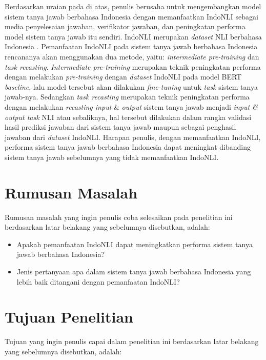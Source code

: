 Berdasarkan uraian pada di atas, penulis berusaha untuk mengembangkan model sistem tanya jawab berbahasa Indonesia dengan memanfaatkan IndoNLI sebagai media penyelesaian jawaban, verifikator jawaban, dan peningkatan performa model sistem tanya jawab itu sendiri. IndoNLI merupakan \emph{dataset} NLI berbahasa Indonesia \citep{mahendra-etal-2021-indonli}. Pemanfaatan IndoNLI pada sistem tanya jawab berbahasa Indonesia rencananya akan menggunakan dua metode, yaitu: \emph{intermediate pre-training} dan \emph{task recasting}. \emph{Intermediate pre-training} merupakan teknik peningkatan performa dengan melakukan \emph{pre-training} dengan \emph{dataset} IndoNLI pada model BERT \emph{baseline}, lalu model tersebut akan dilakukan \emph{fine-tuning} untuk \emph{task} sistem tanya jawab-nya. Sedangkan \emph{task recasting} merupakan teknik peningkatan performa dengan melakukan \emph{recasting input} \& \emph{output} sistem tanya jawab menjadi \emph{input \& output task} NLI atau sebaliknya, hal tersebut dilakukan dalam rangka validasi hasil prediksi jawaban dari sistem tanya jawab maupun sebagai penghasil jawaban dari \emph{dataset} IndoNLI. Harapan penulis, dengan memanfaatkan IndoNLI, performa sistem tanya jawab berbahasa Indonesia dapat meningkat dibanding sistem tanya jawab sebelumnya yang tidak memanfaatkan IndoNLI.

\section{Rumusan Masalah}
\label{sec:rumusanMasalah}
Rumusan masalah yang ingin penulis coba selesaikan pada penelitian ini berdasarkan latar belakang yang sebelumnya disebutkan, adalah:

\begin{itemize}

    \item Apakah pemanfaatan IndoNLI dapat meningkatkan performa sistem tanya jawab berbahasa Indonesia?

    \item Jenis pertanyaan apa dalam sistem tanya jawab berbahasa Indonesia yang lebih baik ditangani dengan pemanfaatan IndoNLI?
    
\end{itemize}

\section{Tujuan Penelitian}
\label{sec:tujuanPenelitian}
Tujuan yang ingin penulis capai dalam penelitian ini berdasarkan latar belakang yang sebelumnya disebutkan, adalah:

